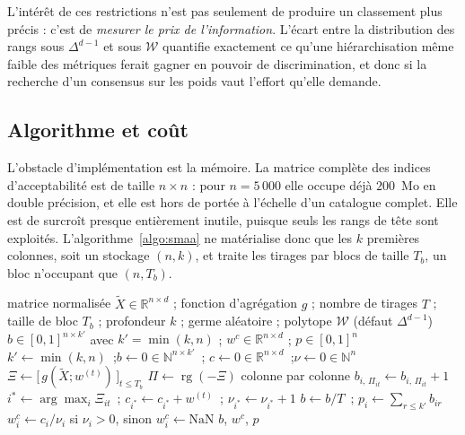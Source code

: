 \documentclass[11pt,a4paper]{article}
\theoremstyle{definition}
\theoremstyle{remark}
\newcommand{\R}{\mathbb{R}}
\newcommand{\N}{\mathbb{N}}
\newcommand{\Unif}{\mathcal{U}}
\newcommand{\simplex}{\Delta^{d-1}}
\newcommand{\rg}{\operatorname{rg}}
\begin{document}
\bigskip

L'intérêt de ces restrictions n'est pas seulement de produire un classement plus précis :
c'est de \emph{mesurer le prix de l'information}. L'écart entre la distribution des rangs
sous $\simplex$ et sous $\mathcal{W}$ quantifie exactement ce qu'une hiérarchisation même
faible des métriques ferait gagner en pouvoir de discrimination, et donc si la recherche
d'un consensus sur les poids vaut l'effort qu'elle demande.

\bigskip

\subsection{Algorithme et coût}
\label{sec:smaa-algo}

\medskip

L'obstacle d'implémentation est la mémoire. La matrice complète des indices
d'acceptabilité est de taille $n \times n$ : pour $n = 5\,000$ elle occupe déjà
$200$~Mo en double précision, et elle est hors de portée à l'échelle d'un catalogue
complet. Elle est de surcroît presque entièrement inutile, puisque seuls les rangs de tête
sont exploités. L'algorithme~\ref{algo:smaa} ne matérialise donc que les $k$ premières
colonnes, soit un stockage $(n, k)$, et traite les tirages par blocs de taille $T_b$, un
bloc n'occupant que $(n, T_b)$.

\medskip

\begin{algorithm}[htbp]
  \caption{SMAA --- indices d'acceptabilité, poids centraux et facteur de confiance}
  \label{algo:smaa}
  \begin{algorithmic}[1]
    \Require matrice normalisée $\tilde{X} \in \R^{n\times d}$ ; fonction d'agrégation
      $g$ ; nombre de tirages $T$ ; taille de bloc $T_b$ ; profondeur $k$ ; germe
      aléatoire ; polytope $\mathcal{W}$ (défaut $\simplex$)
    \Ensure $b \in [0,1]^{n \times k'}$ avec $k' = \min(k,n)$ ;
      $w^{c} \in \R^{n\times d}$ ; $p \in [0,1]^n$
    \State $k' \gets \min(k, n)$~;\quad $b \gets 0 \in \N^{n \times k'}$~;\quad
      $c \gets 0 \in \R^{n\times d}$~;\quad $\nu \gets 0 \in \N^n$
    \For{chaque bloc $W_b \in \R^{T_b \times d}$,
      $w^{(t)} \sim \Unif(\mathcal{W})$}
      \State $\Xi \gets \big[\,g(\tilde{X}; w^{(t)})\,\big]_{t \le T_b}$
      \State $\Pi \gets \rg(-\Xi)$ colonne par colonne
        \State $b_{i,\,\Pi_{it}} \gets b_{i,\,\Pi_{it}} + 1$
      \EndFor
        \State $i^{*} \gets \arg\max_i \Xi_{it}$~;\quad
          $c_{i^{*}} \gets c_{i^{*}} + w^{(t)}$~;\quad
          $\nu_{i^{*}} \gets \nu_{i^{*}} + 1$
      \EndFor
    \EndFor
    \State $b \gets b / T$~;\quad
      $p_i \gets \sum_{r \le k'} b_{ir}$
    \State $w^{c}_i \gets c_i / \nu_i$ si $\nu_i > 0$, sinon $w^{c}_i \gets \mathrm{NaN}$
    \State \Return $b$, $w^{c}$, $p$
  \end{algorithmic}
\end{algorithm}
\end{document}
